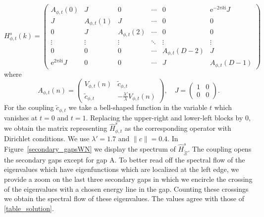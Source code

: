 \documentclass[11pt]{amsart}
\begin{document}
\[
H_{\phi,t}^{s}(k) = \begin{pmatrix}
	A_{\phi,t}(0) & J & 0 & \cdots & 0 & \mathrm{e}^{-2\pi k\mathrm{i}}J \\
	J & A_{\phi,t}(1) & J & \cdots & 0 & 0 \\
	0 & J & A_{\phi,t}(2) & \cdots & 0 & 0 \\
	\vdots & \vdots & \vdots & \ddots & \vdots & \vdots \\
	0 & 0 & 0 & \cdots & A_{\phi,t}(D-2) & J \\
	\mathrm{e}^{2\pi k\mathrm{i}}J  & 0 & 0 & \cdots & J & A_{\phi,t}(D-1)
\end{pmatrix}
\]
where 
$$A_{\phi,t}(n)=\begin{pmatrix}
	V_{\phi,t}(n) & \tilde c_{\phi,t}\\
	\tilde c_{\phi,t} & -\frac{\lambda'}{\lambda} V_{\phi,t}(n) 
\end{pmatrix}, \quad J =\begin{pmatrix}
	1 & 0\\
	0 & 0 
\end{pmatrix}.$$
For the coupling $\tilde c_{\phi,t}$ we take a bell-shaped function in the variable $t$ which vanishes at $t=0$ and $t=1$. Replacing the upper-right and lower-left blocks by $0$, we obtain the matrix representing $\hat{H}_{\phi,t}^{s}$ as the corresponding operator with Dirichlet conditions. We use $\lambda'=1.7$ and $\|c\| = 0.4$. In Figure~\ref{secondary_gapsWN} we  display the spectrum of $\hat{H}_{\tilde{\Xi}}^{s}$. 
The coupling opens the secondary gaps except for gap A. To better read off the spectral flow of the eigenvalues which have eigenfunctions which are localized at the left edge, we provide a zoom on the last three secondary gaps in which we encircle the crossing of the eigenvalues with a chosen energy line in the gap. Counting these crossings we obtain the spectral flow of these eigenvalues. The values agree with those of \eqref{table_solution}.
\end{document}
